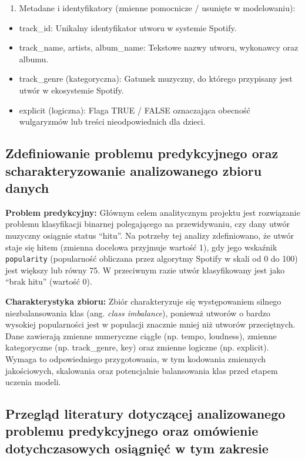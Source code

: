 \documentclass[
]{article}
\providecommand{\tightlist}{%
  \setlength{\itemsep}{0pt}\setlength{\parskip}{0pt}}
\begin{document}
\begin{enumerate}
\def\labelenumi{\arabic{enumi}.}
\setcounter{enumi}{3}
\tightlist
\item
  Metadane i identyfikatory (zmienne pomocnicze / usunięte w
  modelowaniu):
\end{enumerate}

\begin{itemize}
\item
  track\_id: Unikalny identyfikator utworu w systemie Spotify.
\item
  track\_name, artists, album\_name: Tekstowe nazwy utworu, wykonawcy
  oraz albumu.
\item
  track\_genre (kategoryczna): Gatunek muzyczny, do którego przypisany
  jest utwór w ekosystemie Spotify.
\item
  explicit (logiczna): Flaga TRUE / FALSE oznaczająca obecność
  wulgaryzmów lub treści nieodpowiednich dla dzieci.
\end{itemize}

\subsection{Zdefiniowanie problemu predykcyjnego oraz scharakteryzowanie
analizowanego zbioru
danych}\label{zdefiniowanie-problemu-predykcyjnego-oraz-scharakteryzowanie-analizowanego-zbioru-danych}

\textbf{Problem predykcyjny:} Głównym celem analitycznym projektu jest
rozwiązanie problemu klasyfikacji binarnej polegającego na
przewidywaniu, czy dany utwór muzyczny osiągnie status ``hitu''. Na
potrzeby tej analizy zdefiniowano, że utwór staje się hitem (zmienna
docelowa przyjmuje wartość 1), gdy jego wskaźnik \texttt{popularity}
(popularność obliczana przez algorytmy Spotify w skali od 0 do 100) jest
większy lub równy 75. W przeciwnym razie utwór klasyfikowany jest jako
``brak hitu'' (wartość 0).

\textbf{Charakterystyka zbioru:} Zbiór charakteryzuje się występowaniem
silnego niezbalansowania klas (ang. \emph{class imbalance}), ponieważ
utworów o bardzo wysokiej popularności jest w populacji znacznie mniej
niż utworów przeciętnych. Dane zawierają zmienne numeryczne ciągłe (np.
tempo, loudness), zmienne kategoryczne (np. track\_genre, key) oraz
zmienne logiczne (np. explicit). Wymaga to odpowiedniego przygotowania,
w tym kodowania zmiennych jakościowych, skalowania oraz potencjalnie
balansowania klas przed etapem uczenia modeli.

\subsection{Przegląd literatury dotyczącej analizowanego problemu
predykcyjnego oraz omówienie dotychczasowych osiągnięć w tym
zakresie}\label{przeglux105d-literatury-dotyczux105cej-analizowanego-problemu-predykcyjnego-oraz-omuxf3wienie-dotychczasowych-osiux105gniux119ux107-w-tym-zakresie}
\end{document}
